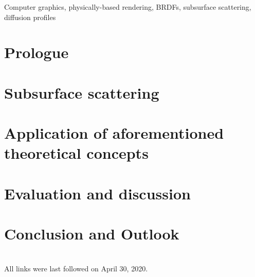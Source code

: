 \documentclass[english,runningheads,a4paper]{llncs}[2018/03/10]
\begin{document}
\begin{keywords}
  Computer graphics, physically-based rendering, BRDFs, subsurface scattering, diffusion profiles
\end{keywords}

\section{Prologue}
\label{sec:intro}

\section{Subsurface scattering}
\label{sec:subsurface}

\section{Application of aforementioned theoretical concepts}
\label{sec:application}

\section{Evaluation and discussion}
\label{sec:evalanddiscuss}

\section{Conclusion and Outlook}
\label{sec:outlook}

\nocite{*}

\renewcommand{\bibsection}{\section*{References}} %

\begingroup
  \ifluatex
  \else
  \fi
  \small %
  
\endgroup

\ \\
%
All links were last followed on April 30, 2020.
\end{document}
